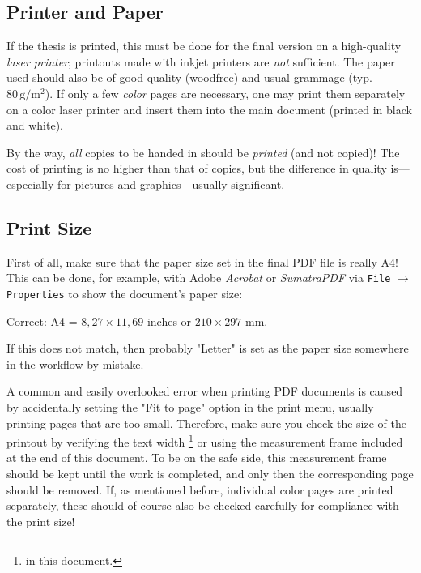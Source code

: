 \subsection{Printer and Paper}

If the thesis is printed, this must be done for the final version on a
high-quality \emph{laser printer}; printouts made with inkjet printers are
\emph{not} sufficient. The paper used should also be of good quality (woodfree)
and usual grammage (typ.\ $80\,\mathrm{g} / \mathrm{m}^2$). If only a few
\emph{color} pages are necessary, one may print them separately on a color laser
printer and insert them into the main document (printed in black and white).

By the way, \emph{all} copies to be handed in should be \emph{printed} (and not 
copied)! The cost of printing is no higher than that of copies, but the difference
in quality is---especially for pictures and graphics---usually significant.


\subsection{Print Size}

First of all, make sure that the paper size set in the final PDF file is really
\textrm{A4}! This can be done, for example, with Adobe \emph{Acrobat} or 
\emph{SumatraPDF} via \texttt{File} $\rightarrow$ \texttt{Properties} 
to show the document's paper size:
%
\begin{center}
	\textrm{Correct:} A4 = $8{,}27 \times 11{,}69$ inches or $210 \times 297$ mm.
\end{center}
%
If this does not match, then probably "Letter" is set as the paper size somewhere
in the workflow by mistake.

A common and easily overlooked error when printing PDF documents is caused by 
accidentally setting the "Fit to page" option in the print menu, usually printing 
pages that are too small. Therefore, make sure you check the size of the printout 
by verifying the text width%
\footnote{\Convert[unit=mm]{\the\textwidth}	in this document.} %
or using the measurement frame included at the end of this document.
To be on the safe side, this measurement frame should be kept until the work 
is completed, and only then the corresponding page should be removed.
If, as mentioned before, individual color pages are printed separately, these 
should of course also be checked carefully for compliance with the print size!


